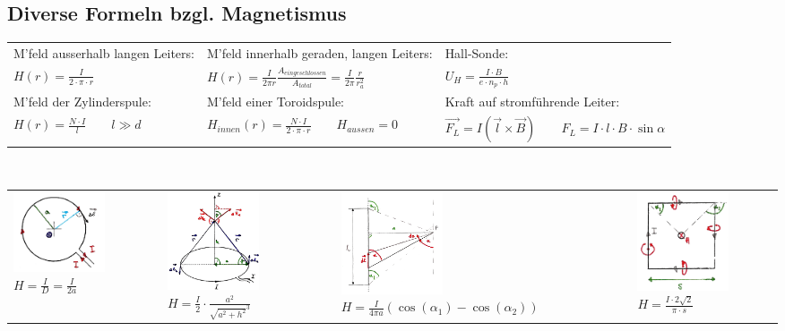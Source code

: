 \subsection{Diverse Formeln bzgl. Magnetismus}

\begin{tabular}[c]{|l|l|l|}
\hline
M'feld ausserhalb langen Leiters:
	& M'feld innerhalb geraden, langen Leiters: 
	& Hall-Sonde:\\
$H(r) = \frac{I}{2 \cdot \pi \cdot r}$
	&$H(r) = \frac{I}{2 \pi r} \frac{A_{eingeschlossen}}{A_{total}} = 
	 \frac{I}{2 \pi} \frac{r}{r_a^2}$
	& $U_H = \frac{I \cdot B}{e \cdot n_p \cdot h}$\\
\hline
M'feld der Zylinderspule:
	&M'feld einer Toroidspule:
	&Kraft auf stromführende Leiter:\\
$H(r) = \frac{N \cdot I}{l} \qquad l \gg d$
	& $H_{innen}(r) = \frac{N \cdot I}{2 \cdot \pi \cdot r} \qquad H_{aussen} = 0$
	&$\vec{F_L} = I (\vec{l} \times \vec{B}) \qquad F_L = I \cdot l \cdot B \cdot
	\sin{\alpha}$ \\
\hline
\end{tabular}\\


\begin{tabular}{llll}
\parbox{4.5cm}{
	\includegraphics[width=2.7cm]{./images/biot1.png} \\
	$H =\frac{I}{D} = \frac{I}{2a}$}
& \parbox{4.5cm}{
	\includegraphics[width=2.7cm]{./images/biot2.png} \\
	$H=\frac{I}{2} \cdot \frac{a^2}{\sqrt{a^2+h^2}^3}$}
& \parbox{4.5cm}{
	\includegraphics[width=3cm]{./images/biot3.png} \\
	$H=\frac{I}{4\pi a}(\cos(\alpha_1)- \cos(\alpha_2))$}
& \parbox{4.5cm}{
	\includegraphics[width=2.7cm]{./images/biot4.png} \\
	$H= \frac{I \cdot 2 \sqrt{2}}{\pi \cdot s}$ }
\end{tabular}\\

